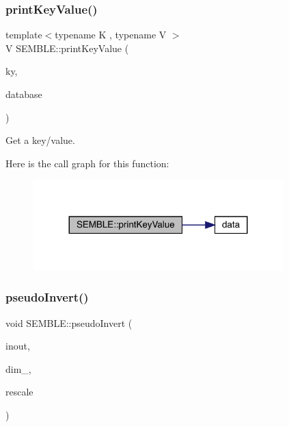 \subsubsection{\texorpdfstring{printKeyValue()}{printKeyValue()}}
{\footnotesize\ttfamily template$<$typename K , typename V $>$ \\
V S\+E\+M\+B\+L\+E\+::print\+Key\+Value (\begin{DoxyParamCaption}\item[{const \mbox{\hyperlink{test__db_8cc_ab54a55a9054a3f0247c74233453ae568}{K}} \&}]{ky,  }\item[{F\+I\+L\+E\+D\+B\+::\+All\+Conf\+Store\+DB$<$ Serial\+D\+B\+Key$<$ \mbox{\hyperlink{test__db_8cc_ab54a55a9054a3f0247c74233453ae568}{K}} $>$, Serial\+D\+B\+Data$<$ typename Ensem\+Scalar$<$ V $>$\+::Type\+\_\+t $>$ $>$ \&}]{database }\end{DoxyParamCaption})}



Get a key/value. 

Here is the call graph for this function\+:
\nopagebreak
\begin{figure}[H]
\begin{center}
\leavevmode
\includegraphics[width=275pt]{d7/dfd/namespaceSEMBLE_ab37ccf132600d41472bb11c6ff531166_cgraph}
\end{center}
\end{figure}
\mbox{\label{namespaceSEMBLE_aea218466ee1ef3d98f79fcd3cf6d0c49}} 
\subsubsection{\texorpdfstring{pseudoInvert()}{pseudoInvert()}}
{\footnotesize\ttfamily void S\+E\+M\+B\+L\+E\+::pseudo\+Invert (\begin{DoxyParamCaption}\item[{\mbox{\hyperlink{structSEMBLE_1_1SembleVector}{Semble\+Vector}}$<$ double $>$ \&}]{inout,  }\item[{const int}]{dim\+\_\+,  }\item[{bool}]{rescale }\end{DoxyParamCaption})}

